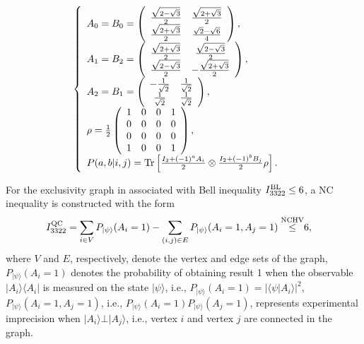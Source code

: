 \documentclass[pra,aps,notitlepage,superscriptaddress,showpacs,showkeys]{revtex4-1}
\theoremstyle{definition}
\theoremstyle{remark}
\begin{document}
\begin{eqnarray}
\left\{
  \begin{array}{ll}
    A_0=B_0=\left(
          \begin{array}{cc}
            \frac{\sqrt{2-\sqrt{3}}}{2} & \frac{\sqrt{2+\sqrt{3}}}{2} \\
            \frac{\sqrt{2+\sqrt{3}}}{2} & \frac{\sqrt{2}-\sqrt{6}}{4} \\
          \end{array}
        \right),& \\
    A_1=B_2=\left(
          \begin{array}{cc}
            \frac{\sqrt{2+\sqrt{3}}}{2} & \frac{\sqrt{2-\sqrt{3}}}{2} \\
            \frac{\sqrt{2-\sqrt{3}}}{2} & -\frac{\sqrt{2+\sqrt{3}}}{2} \\
          \end{array}
        \right),& \\
    A_2=B_1=\left(
          \begin{array}{cc}
            -\frac{1}{\sqrt{2}} & \frac{1}{\sqrt{2}} \\
            \frac{1}{\sqrt{2}} & \frac{1}{\sqrt{2}} \\
          \end{array}
        \right), & \\
\rho=\frac{1}{2}\left(
       \begin{array}{cccc}
        1 & 0 & 0 & 1 \\
         0 & 0 & 0 & 0 \\
         0 & 0 & 0 & 0 \\
         1 & 0 & 0 & 1 \\
       \end{array}
     \right)
, &\\
P(a,b|i,j)={\rm{Tr}}\left[\frac{I_2+(-1)^aA_i}{2}\otimes \frac{I_2+(-1)^bB_j}{2}\rho\right]. &
  \end{array}
\right.
\end{eqnarray}



For the exclusivity graph in \cite{MT} associated with Bell inequality $I_{3322}^{\rm BL}\leq 6$,
a NC inequality is constructed with the form
\begin{eqnarray}
I_{3322}^{\rm QC}
=\sum_{i\in V}P_{|\psi\rangle}(A_i=1)-\sum_{(i,j)\in E}P_{|\psi\rangle}(A_i=1,A_j=1)\overset{{\rm{NCHV}}}\leq& 6,
\label{I3322QC}
\end{eqnarray}
where $V$ and $E$, respectively, denote the vertex and edge sets of the graph,
$P_{|\psi\rangle}(A_i=1)$ denotes the probability of obtaining result 1 when the observable $|A_i\rangle\langle A_i|$ is measured on the state $|\psi\rangle $,  i.e., $P_{|\psi\rangle}(A_i=1)= |\langle \psi|A_i\rangle|^2,$ $P_{|\psi\rangle}(A_i=1,A_j=1)$, i.e.,  $P_{|\psi\rangle}(A_i=1)P_{|\psi\rangle}(A_j=1)$, represents experimental imprecision when $|A_i\rangle\bot |A_j\rangle$, i.e., vertex $i$ and vertex $j$ are connected in the graph.
\end{document}
